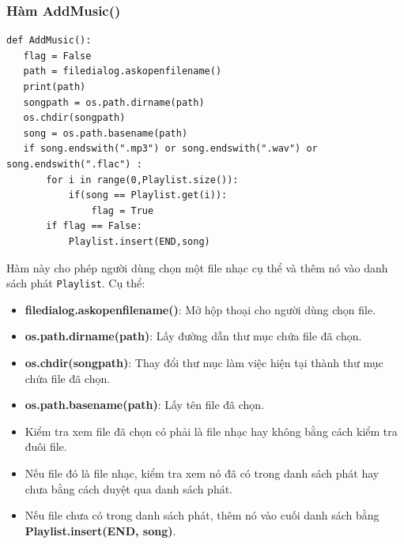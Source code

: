 \documentclass[a4paper]{article}
\begin{document}
\begin{enumerate}
\subsubsection{Hàm AddMusic()}
\begin{mdframed}[hidealllines=true,backgroundcolor=magenta!10]
\begin{lstlisting}
def AddMusic():
   flag = False
   path = filedialog.askopenfilename()
   print(path)
   songpath = os.path.dirname(path)
   os.chdir(songpath)
   song = os.path.basename(path)
   if song.endswith(".mp3") or song.endswith(".wav") or song.endswith(".flac") :
       for i in range(0,Playlist.size()):
           if(song == Playlist.get(i)):
               flag = True
       if flag == False:
           Playlist.insert(END,song)
\end{lstlisting}
\end{mdframed}
Hàm này cho phép người dùng chọn một file nhạc cụ thể và thêm nó vào danh sách phát \texttt{Playlist}. Cụ thể:
\begin{itemize}
   \item \textbf{filedialog.askopenfilename()}: Mở hộp thoại cho người dùng chọn file.
   \item \textbf{os.path.dirname(path)}: Lấy đường dẫn thư mục chứa file đã chọn.
   \item \textbf{os.chdir(songpath)}: Thay đổi thư mục làm việc hiện tại thành thư mục chứa file đã chọn.
   \item \textbf{os.path.basename(path)}: Lấy tên file đã chọn.
   \item Kiểm tra xem file đã chọn có phải là file nhạc hay không bằng cách kiểm tra đuôi file.
   \item Nếu file đó là file nhạc, kiểm tra xem nó đã có trong danh sách phát hay chưa bằng cách duyệt qua danh sách phát.
   \item Nếu file chưa có trong danh sách phát, thêm nó vào cuối danh sách bằng \textbf{Playlist.insert(END, song)}.
\end{itemize}


\end{enumerate}
\end{document}
